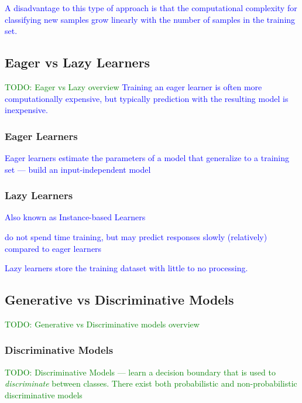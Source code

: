 \textcolor{blue}{A disadvantage to this type of approach is that the computational complexity for classifying new samples grow linearly with the number of samples in the training set.}



\subsection{Eager vs Lazy Learners}

\textcolor{green}{TODO: Eager vs Lazy overview}
\textcolor{blue}{Training an eager learner is often more computationally expensive, but typically prediction with the resulting model is inexpensive.}

\subsubsection{Eager Learners}

\textcolor{blue}{Eager learners estimate the parameters of a model that generalize to a training set --- build an input-independent model}

\subsubsection{Lazy Learners}

\textcolor{blue}{Also known as Instance-based Learners}

\textcolor{blue}{do not spend time training, but may predict responses slowly (relatively) compared to eager learners}

\textcolor{blue}{Lazy learners store the training dataset with little to no processing.}


\subsection{Generative vs Discriminative Models}

\textcolor{green}{TODO: Generative vs Discriminative models overview}

\subsubsection{Discriminative Models}

\textcolor{green}{TODO: Discriminative Models --- learn a decision boundary that is used to \textit{discriminate} between classes. There exist both probabilistic and non-probabilistic discriminative models}

